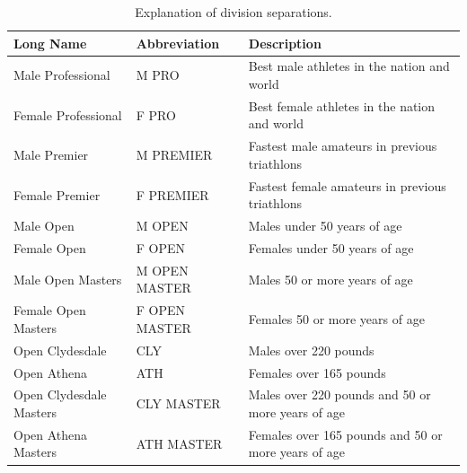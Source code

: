 \documentclass[12pt]{article}
\begin{document}
\begin{table}[H]
\centering

\label{Table 1}
\begin{tabular}{|l|l|l|}
\hline
\textbf{Long Name}   & \textbf{Abbreviation} & \textbf{Description}                \\ \hline
Male Professional    & M PRO        & Best male athletes in the nation and world     \\ \hline
Female Professional   & F PRO        & Best female athletes in the nation and world    \\ \hline
Male Premier      & M PREMIER      & Fastest male amateurs in previous triathlons    \\ \hline
Female Premier     & F PREMIER      & Fastest female amateurs in previous triathlons   \\ \hline
Male Open        & M OPEN        & Males under 50 years of age             \\ \hline
Female Open       & F OPEN        & Females under 50 years of age            \\ \hline
Male Open Masters    & M OPEN MASTER    & Males 50 or more years of age            \\ \hline
Female Open Masters   & F OPEN MASTER    & Females 50 or more years of age           \\ \hline
Open Clydesdale     & CLY         & Males over 220 pounds                \\ \hline
Open Athena       & ATH         & Females over 165 pounds               \\ \hline
Open Clydesdale Masters & CLY MASTER      & Males over 220 pounds and 50 or more years of age  \\ \hline
Open Athena Masters   & ATH MASTER      & Females over 165 pounds and 50 or more years of age \\ \hline
\end{tabular}
\caption{Explanation of division separations.}
\end{table}
\end{document}
